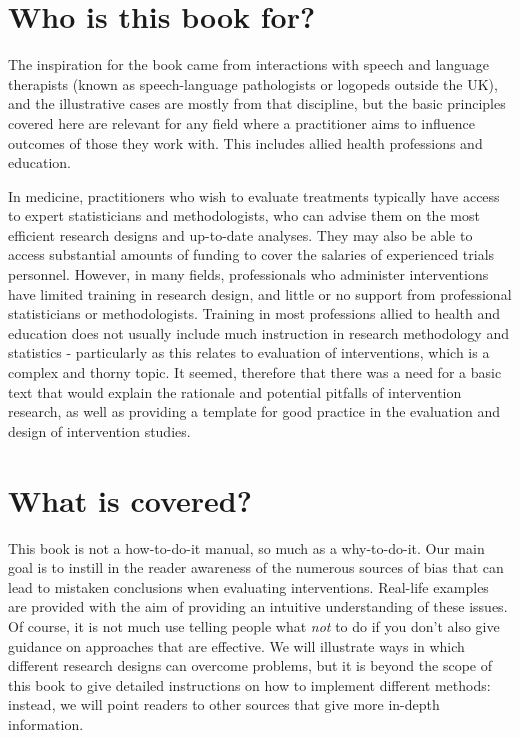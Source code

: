 \documentclass{krantz}
\begin{document}
\hypertarget{who-is-this-book-for}{%
\section*{Who is this book for?}\label{who-is-this-book-for}}

The inspiration for the book came from interactions with speech and language therapists (known as speech-language pathologists or logopeds outside the UK), and the illustrative cases are mostly from that discipline, but the basic principles covered here are relevant for any field where a practitioner aims to influence outcomes of those they work with. This includes allied health professions and education.

In medicine, practitioners who wish to evaluate treatments typically have access to expert statisticians and methodologists, who can advise them on the most efficient research designs and up-to-date analyses. They may also be able to access substantial amounts of funding to cover the salaries of experienced trials personnel. However, in many fields, professionals who administer interventions have limited training in research design, and little or no support from professional statisticians or methodologists. Training in most professions allied to health and education does not usually include much instruction in research methodology and statistics - particularly as this relates to evaluation of interventions, which is a complex and thorny topic. It seemed, therefore that there was a need for a basic text that would explain the rationale and potential pitfalls of intervention research, as well as providing a template for good practice in the evaluation and design of intervention studies.

\hypertarget{what-is-covered}{%
\section*{What is covered?}\label{what-is-covered}}

This book is not a how-to-do-it manual, so much as a why-to-do-it. Our main goal is to instill in the reader awareness of the numerous sources of bias that can lead to mistaken conclusions when evaluating interventions. Real-life examples are provided with the aim of providing an intuitive understanding of these issues. Of course, it is not much use telling people what \emph{not} to do if you don't also give guidance on approaches that are effective. We will illustrate ways in which different research designs can overcome problems, but it is beyond the scope of this book to give detailed instructions on how to implement different methods: instead, we will point readers to other sources that give more in-depth information.
\end{document}
